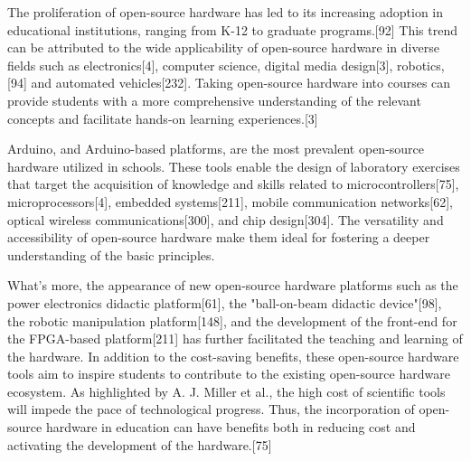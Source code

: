 \documentclass[acmtog]{acmart}
\begin{document}

The proliferation of open-source hardware has led to its increasing adoption in educational institutions, ranging from K-12 to graduate programs.[92] This trend can be attributed to the wide applicability of open-source hardware in diverse fields such as electronics[4], computer science, digital media design[3], robotics,[94] and automated vehicles[232]. Taking open-source hardware into courses can provide students with a more comprehensive understanding of the relevant concepts and facilitate hands-on learning experiences.[3]

Arduino, and Arduino-based platforms, are the most prevalent open-source hardware utilized in schools. These tools enable the design of laboratory exercises that target the acquisition of knowledge and skills related to microcontrollers[75], microprocessors[4], embedded systems[211], mobile communication networks[62], optical wireless communications[300], and chip design[304]. The versatility and accessibility of open-source hardware make them ideal for fostering a deeper understanding of the basic principles.

What's more, the appearance of new open-source hardware platforms such as the power electronics didactic platform[61], the "ball-on-beam didactic device"[98], the robotic manipulation platform[148], and the development of the front-end for the FPGA-based platform[211] has further facilitated the teaching and learning of the hardware. In addition to the cost-saving benefits, these open-source hardware tools aim to inspire students to contribute to the existing open-source hardware ecosystem. As highlighted by A. J. Miller et al., the high cost of scientific tools will impede the pace of technological progress. Thus, the incorporation of open-source hardware in education can have benefits both in reducing cost and activating the development of the hardware.[75]
\end{document}
